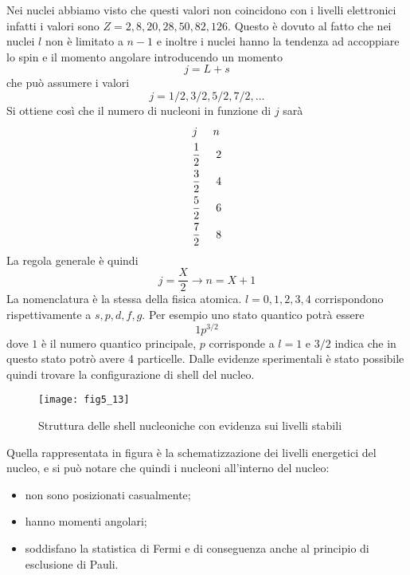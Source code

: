 Nei nuclei abbiamo visto che questi valori non coincidono con i livelli elettronici infatti i valori sono $Z=2, 8, 20, 28, 50, 82, 126$.
Questo è dovuto al fatto che nei nuclei $l$ non è limitato a $n-1$ e inoltre i nuclei hanno la tendenza ad accoppiare lo spin e il momento angolare introducendo un momento 
\[
j=L+s
\]
che può assumere i valori 
\[
j=1/2, 3/2, 5/2, 7/2, \dots
\]
Si ottiene così che il numero di nucleoni in funzione di $j$ sarà
\begin{equation}
\begin{split}
&j\hspace{0.5cm}n\\
&\frac{1}{2}\hspace{0.5cm}2\\
&\frac{3}{2}\hspace{0.5cm}4\\
&\frac{5}{2}\hspace{0.5cm}6\\
&\frac{7}{2}\hspace{0.5cm}8
\end{split}
\end{equation}
La regola generale è quindi
\begin{equation}
j=\frac{X}{2}\longrightarrow n=X+1
\end{equation}
La nomenclatura è la stessa della fisica atomica.
$l=0, 1, 2, 3, 4$ corrispondono rispettivamente a $s, p, d, f, g$.
Per esempio uno stato quantico potrà essere
\begin{equation}
1p^{3/2}
\end{equation}
dove $1$ è il numero quantico principale, $p$ corrisponde a $l=1$ e $3/2$ indica che in questo stato potrò avere 4 particelle.
Dalle evidenze sperimentali è stato possibile quindi trovare la configurazione di shell del nucleo.
\begin{figure}
\centering
\texttt{[image: fig5\_13]}
\caption{Struttura delle shell nucleoniche con evidenza sui livelli stabili}
\end{figure}

Quella rappresentata in figura è la schematizzazione dei livelli energetici del nucleo, e si può notare che quindi i nucleoni all'interno del nucleo:
\begin{itemize}
\item non sono posizionati casualmente;
\item hanno momenti angolari;
\item soddisfano la statistica di Fermi e di conseguenza anche al principio di esclusione di Pauli.
\end{itemize}


